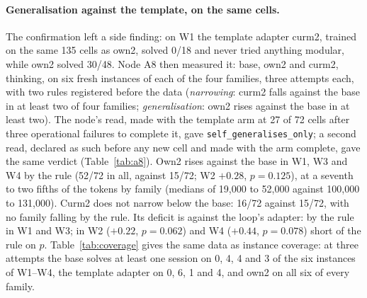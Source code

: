 \documentclass[11pt]{article}
\begin{document}
\paragraph{Generalisation against the template, on the same cells.} The
confirmation left a side finding: on W1 the template adapter curm2,
trained on the same 135 cells as own2, solved 0/18 and never tried
anything modular, while own2 solved 30/48. Node A8 then measured it: base, own2 and curm2, thinking, on six fresh instances of each of the four
families, three attempts each, with two rules registered before the data
(\emph{narrowing}: curm2 falls against the base in at least two of four
families; \emph{generalisation}: own2 rises against the base in at least
two). The node's read, made with the template arm at 27 of 72 cells after
three operational failures to complete it, gave
\texttt{self\_generalises\_only}; a second read, declared as such before
any new cell and made with the arm complete, gave the same verdict
(Table~\ref{tab:a8}). Own2 rises against the base in W1, W3 and W4 by the
rule (52/72 in all, against 15/72; W2 $+0.28$, $p=0.125$), at a seventh
to two fifths of the tokens by family (medians of 19,000 to 52,000
against 100,000 to 131,000). Curm2 does not narrow below the base: 16/72
against 15/72, with no family falling by the rule. Its deficit is against the loop's adapter: by the rule in W1 and W3; in W2 ($+0.22$, $p=0.062$) and W4 ($+0.44$, $p=0.078$) short of the rule on $p$.
Table~\ref{tab:coverage} gives the same data as instance coverage: at
three attempts the base solves at least one session on 0, 4, 4 and 3 of
the six instances of W1--W4, the template adapter on 0, 6, 1 and 4, and
own2 on all six of every family.

\begin{table}[!htbp]
\centering\footnotesize
\setlength{\tabcolsep}{3pt}
\resizebox{\textwidth}{!}{}
\caption{Generalisation against the template, four new families, six fresh instances each, three attempts, thinking. The template column is the complete arm of the second read, with the node read's partial count in parentheses; base and own2 are the same in both reads. Registered rules: own2 $-$ base rises in at least two families; curm2 $-$ base falls in at least two. own2 $-$ curm2 is secondary.}
\label{tab:a8}
\end{table}

\begin{table}[!htbp]
\centering\footnotesize
\resizebox{\textwidth}{!}{}
\caption{Support at small budgets: instances with at least one accepted proof, at the attempts each block ran (descriptive). No block measured more than eight attempts per instance.}
\label{tab:coverage}
\end{table}
\end{document}
